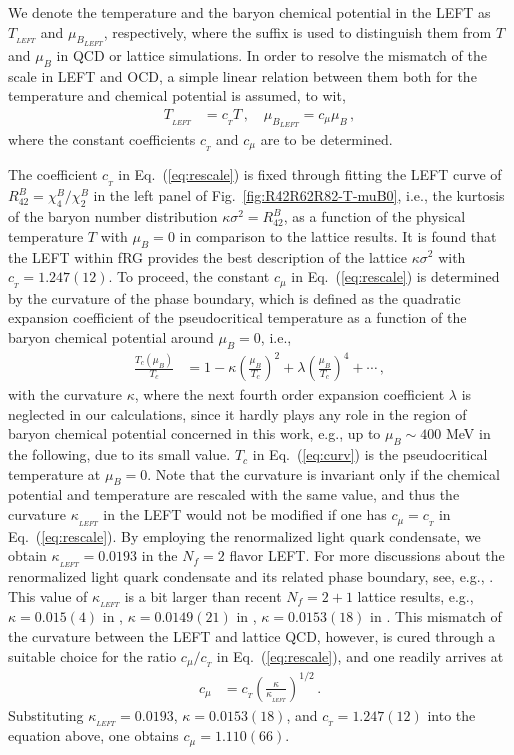 \documentclass[%
reprint,
superscriptaddress,
showpacs,preprintnumbers,
 amsmath,amssymb,
 aps,
prd,
]{revtex4-1}
\def\Fig#1{Fig.~\ref{#1}} \def\Tab#1{Tab.~\ref{#1}}
\def\Eq#1{Eq.~(\ref{#1})}
\begin{document}
We denote the temperature and the baryon chemical potential in the LEFT as $T_{_{LEFT}}$ and $\mu_{B_{LEFT}}$, respectively, where the suffix is used to distinguish them from $T$ and $\mu_{B}$ in QCD or lattice simulations. In order to resolve the mismatch of the scale in LEFT and OCD, a simple linear relation between them both for the temperature and chemical potential is assumed, to wit,
%
\begin{align}
  T_{_{LEFT}}&=c_{_{T}}T\,, \quad \mu_{B_{LEFT}}=c_{\mu}\mu_{B}\,,\label{eq:rescale}
\end{align}
%
where the constant coefficients $c_{_{T}}$ and $c_{\mu}$ are to be determined.

The coefficient $c_{_{T}}$ in \Eq{eq:rescale} is fixed through fitting the LEFT curve of $R^{B}_{42}=\chi^{B}_{4}/\chi^{B}_{2}$ in the left panel of \Fig{fig:R42R62R82-T-muB0}, i.e., the kurtosis of the baryon number distribution $\kappa \sigma^2=R^{B}_{42}$, 
as a function of the physical temperature $T$ with $\mu_B=0$ in comparison to the lattice results. It is found that the LEFT within fRG provides the best description of the lattice $\kappa \sigma^2$ with $c_{_{T}}=1.247(12)$. To proceed, the constant $c_{\mu}$ in \Eq{eq:rescale} is determined by the curvature of the phase boundary, which is defined as the quadratic expansion coefficient of the pseudocritical temperature as a function of the baryon chemical potential around $\mu_B=0$, i.e.,
%
\begin{align}
  \frac{T_c(\mu_B)}{T_c}&=1-\kappa \left(\frac{\mu_B}{T_c}\right)^2+\lambda \left(\frac{\mu_B}{T_c}\right)^4+\cdots\,,\label{eq:curv}
\end{align}
%
with the curvature $\kappa$, where the next fourth order expansion coefficient $\lambda$ is neglected in our calculations, since it hardly plays any role in the region of baryon chemical potential concerned in this work, e.g., up to $\mu_B\sim 400$ MeV in the following, due to its small value. $T_c$ in \Eq{eq:curv} is the pseudocritical temperature at $\mu_B=0$. Note that the curvature is invariant only if the chemical potential and temperature are rescaled with the same value, and thus the curvature $\kappa_{_{LEFT}}$ in the LEFT would not be modified if one has $c_{\mu}=c_{_{T}}$ in \Eq{eq:rescale}. By employing the renormalized light quark condensate, we obtain $\kappa_{_{LEFT}}=0.0193$ in the $N_f=2$ flavor LEFT. For more discussions about the renormalized light quark condensate and its related phase boundary, see, e.g., \cite{Fu:2019hdw}. This value of $\kappa_{_{LEFT}}$ is a bit larger than recent $N_f = 2+1$ lattice results, e.g., $\kappa=0.015(4)$ in \cite{Bazavov:2018mes}, $\kappa=0.0149(21)$ in \cite{Bellwied:2015rza}, $\kappa=0.0153(18)$ in \cite{Borsanyi:2020fev}. This mismatch of the curvature between the LEFT and lattice QCD, however, is cured through a suitable choice for the ratio $c_{\mu}/c_{_{T}}$ in \Eq{eq:rescale}, and one readily arrives at
%
\begin{align}
  c_{\mu}&=c_{_{T}}\left(\frac{\kappa}{\kappa_{_{LEFT}}}\right)^{1/2}\,.\label{eq:cmu}
\end{align}
%
Substituting $\kappa_{_{LEFT}}=0.0193$, $\kappa=0.0153(18)$, and $c_{_{T}}=1.247(12)$ into the equation above, one obtains $c_{\mu}=1.110(66)$.
\end{document}
